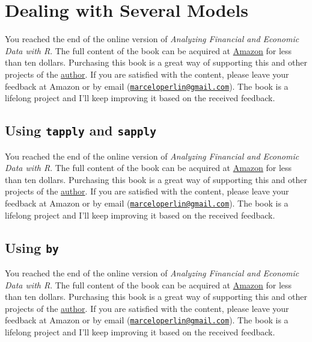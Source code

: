 \documentclass[
  12pt,
]{book}
\newenvironment{pleasebuyit}
{\begin{noteblock}
		
	} {\end{noteblock}}
\begin{document}
\hypertarget{dealing-with-several-models}{%
\section{Dealing with Several Models}\label{dealing-with-several-models}}

\begin{pleasebuyit}
You reached the end of the online version of \emph{Analyzing Financial
and Economic Data with R}. The full content of the book can be acquired
at \href{https://www.amazon.com/dp/B084LSNXMN}{Amazon} for less than ten
dollars. Purchasing this book is a great way of supporting this and
other projects of the \href{https://www.msperlin.com/blog/}{author}. If
you are satisfied with the content, please leave your feedback at Amazon
or by email
(\href{mailto:marceloperlin@gmail.com}{\nolinkurl{marceloperlin@gmail.com}}).
The book is a lifelong project and I'll keep improving it based on the
received feedback.
\end{pleasebuyit}

\hypertarget{using-tapply-and-sapply}{%
\subsection{\texorpdfstring{Using \texttt{tapply} and \texttt{sapply}}{Using tapply and sapply}}\label{using-tapply-and-sapply}}

\begin{pleasebuyit}
You reached the end of the online version of \emph{Analyzing Financial
and Economic Data with R}. The full content of the book can be acquired
at \href{https://www.amazon.com/dp/B084LSNXMN}{Amazon} for less than ten
dollars. Purchasing this book is a great way of supporting this and
other projects of the \href{https://www.msperlin.com/blog/}{author}. If
you are satisfied with the content, please leave your feedback at Amazon
or by email
(\href{mailto:marceloperlin@gmail.com}{\nolinkurl{marceloperlin@gmail.com}}).
The book is a lifelong project and I'll keep improving it based on the
received feedback.
\end{pleasebuyit}

\hypertarget{using-by-1}{%
\subsection{\texorpdfstring{Using \texttt{by}}{Using by}}\label{using-by-1}}

\begin{pleasebuyit}
You reached the end of the online version of \emph{Analyzing Financial
and Economic Data with R}. The full content of the book can be acquired
at \href{https://www.amazon.com/dp/B084LSNXMN}{Amazon} for less than ten
dollars. Purchasing this book is a great way of supporting this and
other projects of the \href{https://www.msperlin.com/blog/}{author}. If
you are satisfied with the content, please leave your feedback at Amazon
or by email
(\href{mailto:marceloperlin@gmail.com}{\nolinkurl{marceloperlin@gmail.com}}).
The book is a lifelong project and I'll keep improving it based on the
received feedback.
\end{pleasebuyit}
\end{document}

